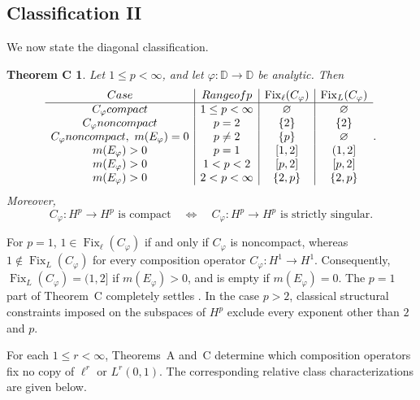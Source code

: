 \documentclass[10pt,a4paper]{amsart}
\newtheorem*{theoremC}{Theorem C}
\newcommand{\D}{\mathbb{D}}
\begin{document}
\subsection*{Classification II}  We now state the diagonal classification.

\begin{theoremC}\label{thm:C}
Let \(1\le p<\infty\), and let \(\varphi:\D\to\D\) be analytic. Then
\[
\begin{array}{c|c|c|c}
\textup{Case}
& \textup{Range of }p
& \operatorname{Fix}_{\ell}(C_\varphi)
& \operatorname{Fix}_{L}(C_\varphi)\\
\hline
C_\varphi\textup{ compact}
& 1\le p<\infty
& \varnothing
& \varnothing\\
C_\varphi\textup{ noncompact}
& p=2
& \{2\}
& \{2\}\\
C_\varphi\textup{ noncompact},\ m(E_\varphi)=0
& p\ne2
& \{p\}
& \varnothing\\
m(E_\varphi)>0
& p=1
& [1,2]
& (1,2]\\
m(E_\varphi)>0
& 1<p<2
& [p,2]
& [p,2]\\
m(E_\varphi)>0
& 2<p<\infty
& \{2,p\}
& \{2,p\}
\end{array}.
\]
Moreover,
\[
        C_\varphi:H^p\to H^p\text{ is compact}
        \quad\Longleftrightarrow\quad
        C_\varphi:H^p\to H^p\text{ is strictly singular}.
\]
\end{theoremC}

For \(p=1\),
\(1\in\operatorname{Fix}_{\ell}(C_\varphi)\) if and only if
\(C_\varphi\) is noncompact, whereas
\(1\notin\operatorname{Fix}_{L}(C_\varphi)\) for every composition
operator \(C_\varphi:H^1\to H^1\). Consequently,
\(\operatorname{Fix}_{L}(C_\varphi)=(1,2]\) if
\(m(E_\varphi)>0\), and is empty if \(m(E_\varphi)=0\). The \(p=1\) part of Theorem~C completely settles
\cite[Problem~4.3(2)]{LNST2017}. In the case \(p>2\), classical structural constraints imposed on the subspaces of \(H^p\)  exclude every exponent other than
\(2\) and \(p\).

For each \(1\le r<\infty\), Theorems~A and~C determine which
composition operators fix no copy of \(\ell^r\) or \(L^r(0,1)\).
The corresponding relative class characterizations are given below.
\end{document}
